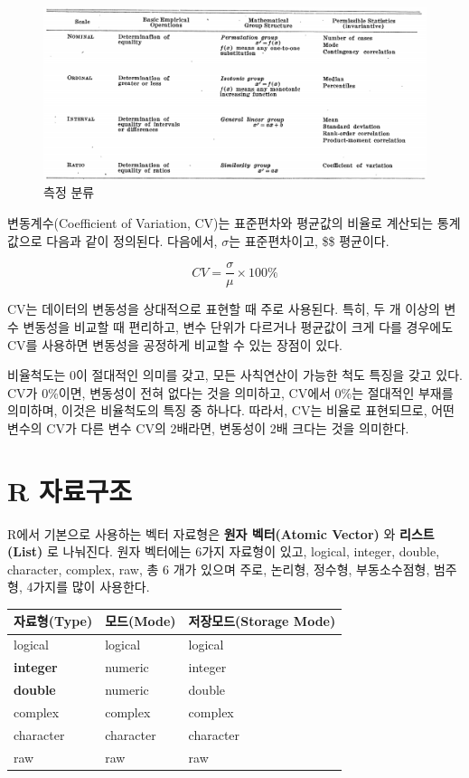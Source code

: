 \documentclass[
  letterpaper,
  chapter,a4paper,showtrims,openright,hidelinks]{oblivoir}
\begin{document}
\begin{figure}

{\centering \includegraphics{images/stevens_measurement.png}

}

\caption{측정 분류}

\end{figure}

변동계수(Coefficient of Variation, CV)는 표준편차와 평균값의 비율로
계산되는 통계값으로 다음과 같이 정의된다. 다음에서, \(\sigma\)는
표준편차이고, \$\mu\$ 평균이다.

\[CV = \frac{\sigma}{\mu} \times 100\%\]

CV는 데이터의 변동성을 상대적으로 표현할 때 주로 사용된다. 특히, 두 개
이상의 변수 변동성을 비교할 때 편리하고, 변수 단위가 다르거나 평균값이
크게 다를 경우에도 CV를 사용하면 변동성을 공정하게 비교할 수 있는 장점이
있다.

비율척도는 0이 절대적인 의미를 갖고, 모든 사칙연산이 가능한 척도 특징을
갖고 있다. CV가 0\%이면, 변동성이 전혀 없다는 것을 의미하고, CV에서
0\%는 절대적인 부재를 의미하며, 이것은 비율척도의 특징 중 하나다.
따라서, CV는 비율로 표현되므로, 어떤 변수의 CV가 다른 변수 CV의 2배라면,
변동성이 2배 크다는 것을 의미한다.

\hypertarget{data-type-basics}{%
\section{R 자료구조}\label{data-type-basics}}

R에서 기본으로 사용하는 벡터 자료형은 \textbf{원자 벡터(Atomic Vector)}
와 \textbf{리스트(List)} 로 나눠진다. 원자 벡터에는 6가지 자료형이 있고,
logical, integer, double, character, complex, raw, 총 6 개가 있으며
주로, 논리형, 정수형, 부동소수점형, 범주형, 4가지를 많이 사용한다.
\autocite{wickham2023r}

\begin{longtable}[]{@{}lll@{}}
\toprule\noalign{}
자료형(Type) & 모드(Mode) & 저장모드(Storage Mode) \\
\midrule\noalign{}
\endhead
\bottomrule\noalign{}
\endlastfoot
logical & logical & logical \\
\textbf{integer} & numeric & integer \\
\textbf{double} & numeric & double \\
complex & complex & complex \\
character & character & character \\
raw & raw & raw \\
\end{longtable}
\end{document}
